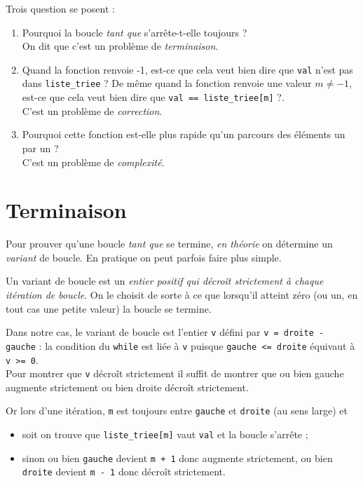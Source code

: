 Trois question se posent :

\begin{enumerate}
	\item 	Pourquoi la boucle \textit{tant que} s'arrête-t-elle toujours ?\\ On dit que c'est un problème de \textit{terminaison}.
	\item 	Quand la fonction renvoie -1, est-ce que cela veut bien dire que \texttt{val} n'est pas dans \texttt{liste_triee} ? De même quand la fonction renvoie une valeur $m\neq -1$, est-ce que cela veut bien dire que \texttt{val == liste_triee[m]} ?.\\
	      C'est un problème de \textit{correction}.
	\item	Pourquoi cette fonction est-elle plus rapide qu'un parcours des éléments un par un ?\\ C'est un problème de \textit{complexité}.
\end{enumerate}


\section{Terminaison}

Pour prouver qu'une boucle \textit{tant que} se termine, \textit{en théorie} on détermine un \textit{variant} de boucle. En pratique on peut parfois faire plus simple.

\begin{definition}[]
	Un variant de boucle est un \textit{entier positif qui décroît strictement à chaque itération de boucle}. On le choisit de sorte à ce que lorsqu'il atteint zéro (ou un, en tout cas une petite valeur) la boucle se termine.\\
\end{definition}

Dans notre cas, le variant de boucle est l'entier \texttt{v} défini par \texttt{v = droite - gauche} : la condition du \texttt{while} est liée à \texttt{v} puisque \texttt{gauche <= droite} équivaut à \texttt{v >= 0}.\\

Pour montrer que \texttt{v} décroît strictement il suffit de montrer que ou bien gauche augmente strictement ou bien droite décroît	strictement.

Or lors d'une itération, \texttt{m} est toujours entre \texttt{gauche} et \texttt{droite} (au sens large) et
\begin{itemize}
	\item soit on trouve que \texttt{liste_triee[m]} vaut \texttt{val} et la boucle s'arrête ;
	\item sinon ou bien \texttt{gauche} devient \texttt{m + 1} donc augmente strictement, ou bien \texttt{droite} devient \texttt{m - 1} donc décroît strictement.
\end{itemize}

